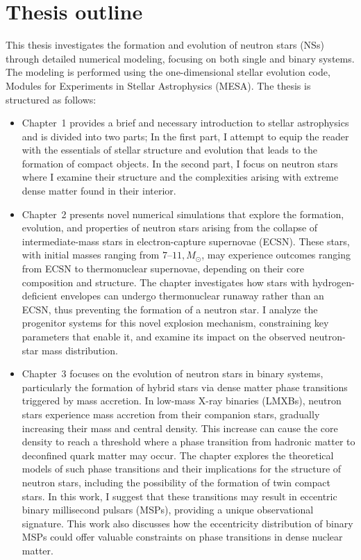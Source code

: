 \documentclass[main.tex]{subfiles}
\begin{document}
    \section{Thesis outline}
    This thesis investigates the formation and evolution of neutron stars (NSs) through detailed numerical modeling, focusing on both single and binary systems. The modeling is performed using the one-dimensional stellar evolution code, Modules for Experiments in Stellar Astrophysics (MESA). The thesis is structured as follows:
    \begin{itemize}
        \item Chapter~1 provides a brief and necessary introduction to stellar astrophysics and is divided into two parts; In the first part, I attempt to equip the reader with the essentials of stellar structure and evolution that leads to the formation of compact objects. In the second part, I focus on neutron stars where I examine their structure and the complexities arising with extreme dense matter found in their interior.
    
        \item Chapter~2 presents novel numerical simulations that explore the formation, evolution, and properties of neutron stars arising from the collapse of intermediate-mass stars in electron-capture supernovae (ECSN). These stars, with initial masses ranging from $7–11 , M_\odot$, may experience outcomes ranging from ECSN to thermonuclear supernovae, depending on their core composition and structure. The chapter investigates how stars with hydrogen-deficient envelopes can undergo thermonuclear runaway rather than an ECSN, thus preventing the formation of a neutron star. I analyze the progenitor systems for this novel explosion mechanism, constraining key parameters that enable it, and examine its impact on the observed neutron-star mass distribution.

        \item Chapter~3 focuses on the evolution of neutron stars in binary systems, particularly the formation of hybrid stars via dense matter phase transitions triggered by mass accretion. In low-mass X-ray binaries (LMXBs), neutron stars experience mass accretion from their companion stars, gradually increasing their mass and central density. This increase can cause the core density to reach a threshold where a phase transition from hadronic matter to deconfined quark matter may occur. The chapter explores the theoretical models of such phase transitions and their implications for the structure of neutron stars, including the possibility of the formation of twin compact stars. In this work, I suggest that these transitions may result in eccentric binary millisecond pulsars (MSPs), providing a unique observational signature. This work also discusses how the eccentricity distribution of binary MSPs could offer valuable constraints on phase transitions in dense nuclear matter.


\end{itemize}
\end{document}
